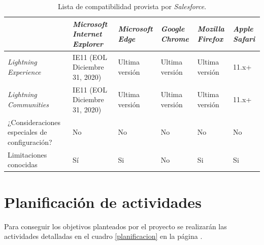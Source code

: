 \begin{table}
\centering
\begin{tabular}{|p{6.0cm}|p{2.5cm}|p{1.4cm}|p{1.3cm}|p{1.3cm}|p{1.0cm}|}
\hline
& \footnotesize{\textbf{\emph{Microsoft Internet Explorer}}}
& \footnotesize{\textbf{\emph{Microsoft Edge}}}
& \footnotesize{\textbf{\emph{Google Chrome}}}
& \footnotesize{\textbf{\emph{Mozilla Firefox}}}
& \footnotesize{\textbf{\emph{Apple Safari}}} \\
\hline
\footnotesize{\emph{Lightning Experience}}
& \footnotesize{IE11 (EOL Diciembre 31, 2020)}
& \footnotesize{Ultima versión}
& \footnotesize{Ultima versión}
& \footnotesize{Ultima versión}
& \footnotesize{11.x+} \\
\footnotesize{\emph{Lightning Communities}}
& \footnotesize{IE11 (EOL Diciembre 31, 2020)}
& \footnotesize{Ultima versión}
& \footnotesize{Ultima versión}
& \footnotesize{Ultima versión}
& \footnotesize{11.x+} \\
\footnotesize{¿Consideraciones especiales de configuración?}
& \footnotesize{No}
& \footnotesize{No}
& \footnotesize{No}
& \footnotesize{No}
& \footnotesize{No} \\
\footnotesize{Limitaciones conocidas}
& \footnotesize{Sí}
& \footnotesize{Si}
& \footnotesize{No}
& \footnotesize{Si}
& \footnotesize{Si} \\
\hline
\end{tabular}
\caption{Lista de compatibilidad provista por \emph{Salesforce}.}
\label{soporte_navegadores}
\end{table}

\section{Planificación de actividades}
Para conseguir los objetivos planteados por el proyecto se realizarán las
actividades detalladas en el cuadro \ref{planificacion} en la página
\pageref{planificacion}.

